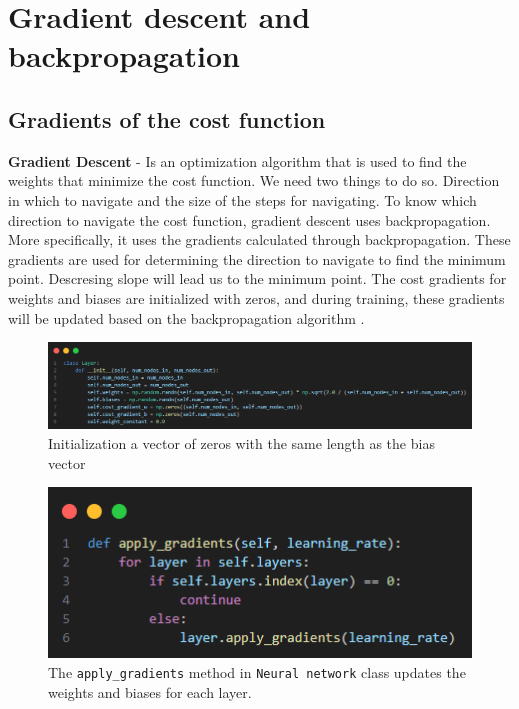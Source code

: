 \documentclass{article}
\begin{document}
\newpage
\section{Gradient descent and backpropagation}
\subsection{Gradients of the cost function}
\textbf{Gradient Descent} - Is an optimization algorithm that is used to find the weights that minimize the cost function. 
We need two things to do so. Direction in which to navigate and the size of the steps for navigating.
To know which direction to navigate the cost function, gradient descent uses backpropagation. More specifically, it uses the gradients calculated through backpropagation. These gradients are used for determining the direction to navigate to find the minimum point. Descresing slope will lead us to the minimum point.
The cost gradients for weights and biases are initialized with zeros, and during training, these gradients will be updated based on the backpropagation algorithm \cite{algorithms} .

\begin{figure}[ht]
    \centering 
    \includegraphics[width=1\textwidth]{images/Xavier-Glorot-initialization-for-weights.png}
    \caption{Initialization a vector of zeros with the same length as the bias vector}
    \label{fig:initialized_cost_gradient}
\end{figure}

\begin{figure}[ht]
    \centering 
    \includegraphics[width=1\textwidth]{images/apply-gradients.png}
    \caption{The \texttt{apply\_gradients} method in \texttt{Neural network} class  updates the weights and biases for each layer.}
    \label{fig:apply_gradients}
\end{figure}
\end{document}
